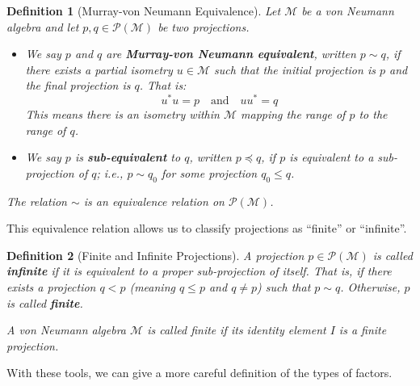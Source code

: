\documentclass[11pt, a4paper]{article}
\theoremstyle{colored_def}
\newtheorem{definition}{Definition}[section]
\theoremstyle{colored_thm}
\theoremstyle{colored_ex}
\newcommand{\M}{\mathcal{M}}
\begin{document}
\begin{definition}[Murray-von Neumann Equivalence]
Let $\M$ be a von Neumann algebra and let $p, q \in \mathcal{P}(\M)$ be two projections.
\begin{itemize}
    \item We say $p$ and $q$ are \textbf{Murray-von Neumann equivalent}, written $p \sim q$, if there exists a partial isometry $u \in \M$ such that the initial projection is $p$ and the final projection is $q$. That is:
    $$ u^*u = p \quad \text{and} \quad uu^* = q $$
    This means there is an isometry within $\M$ mapping the range of $p$ to the range of $q$.
    \item We say $p$ is \textbf{sub-equivalent} to $q$, written $p \preccurlyeq q$, if $p$ is equivalent to a sub-projection of $q$; i.e., $p \sim q_0$ for some projection $q_0 \leq q$.
\end{itemize}
The relation $\sim$ is an equivalence relation on $\mathcal{P}(\M)$.
\end{definition}

This equivalence relation allows us to classify projections as ``finite'' or ``infinite''.

\begin{definition}[Finite and Infinite Projections]
A projection $p \in \mathcal{P}(\M)$ is called \textbf{infinite} if it is equivalent to a proper sub-projection of itself. That is, if there exists a projection $q < p$ (meaning $q \leq p$ and $q \neq p$) such that $p \sim q$. Otherwise, $p$ is called \textbf{finite}.

A von Neumann algebra $\M$ is called finite if its identity element $I$ is a finite projection.
\end{definition}

With these tools, we can give a more careful definition of the types of factors.
\end{document}
